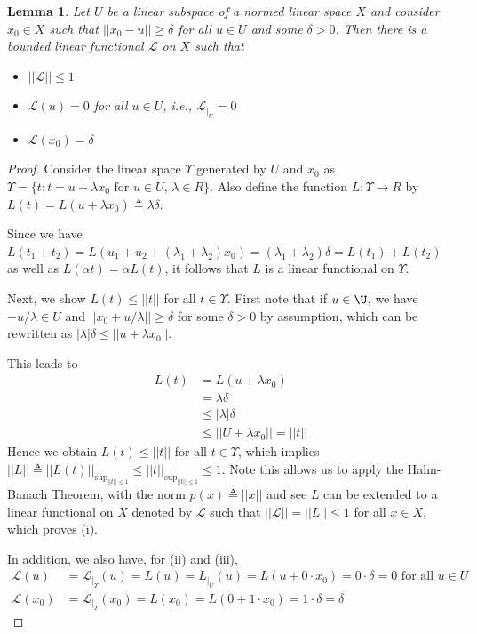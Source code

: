 \documentclass[12pt]{amsart}
\theoremstyle{plain}
\newtheorem{lemma}[thm]{Lemma}
\theoremstyle{definition}
\theoremstyle{remark}
\numberwithin{equation}{section}
\numberwithin{thm}{section}
\begin{document}
\begin{lemma} \label{lemma:ApplyHB}
    Let $U$ be a linear subspace of a normed linear space $X$ and consider $x_0 \in X$ such that $|| x_0 -u || \geq \delta$ for all $u \in U$ and some $\delta > 0$. Then there is a bounded linear functional $\mathcal{L}$ on $X$ such that
    \begin{itemize}
        \item[(i)] $||\mathcal{L}|| \leq 1$
        \item[(ii)] $\mathcal{L}(u)=0$ for all $u \in U$, i.e., $\mathcal{L}_{|_U}=0$
        \item[(iii)] $\mathcal{L}(x_0) = \delta$
    \end{itemize}    
\end{lemma}
\begin{proof}
    Consider the linear space $\Upsilon$ generated by $U$ and $x_0$ as $\Upsilon = \{ t : t =u+\lambda x_0 \text{ for } u \in U \text{, } \lambda \in R \}$. Also define the function $L: \Upsilon \to R$ by $L(t) = L(u+\lambda x_0) \triangleq \lambda \delta$.
    
    Since we have $L(t_1 + t_2) = L(u_1+u_2+(\lambda_1 + \lambda_2)x_0) = (\lambda_1 + \lambda_2)\delta = L(t_1) + L(t_2)$ as well as $L(\alpha t) = \alpha L(t)$, it follows that $L$ is a linear functional on $\Upsilon$.  

    Next, we show $L(t) \leq ||t||$ for all $t \in \Upsilon$. First note that if $u \in \U$, we have $-u/ \lambda \in U$ and $||x_0 + u/\lambda|| \geq \delta$ for some $\delta > 0$ by assumption, which can be rewritten as $|\lambda|\delta \leq ||u +\lambda x_0||$.
    
    This leads to 
    \begin{equation*}
        \begin{aligned}
            L(t) &= L(u+\lambda x_0)\\
            &= \lambda \delta \\
            &\leq |\lambda| \delta \\
            &\leq ||U+\lambda x_0 || =||t||
        \end{aligned}
    \end{equation*}
    Hence we obtain $L(t)\leq ||t||$ for all $t \in \Upsilon$, which implies $||L|| \triangleq ||L(t)||_{ \sup_{||t|| \leq 1}} \leq ||t||_{\sup_{||t||\leq 1}} \leq 1$. Note this allows us to apply the Hahn-Banach Theorem, with the norm $p(x)\triangleq ||x||$ and see $L$ can be extended to a linear functional on $X$ denoted by $\mathcal{L}$ such that $||\mathcal{L}||=||L||\leq 1$ for all $x \in X$, which proves (i).

    In addition, we also have, for (ii) and (iii), 
    \begin{equation*}
    \begin{aligned}
        \mathcal{L}(u) & = \mathcal{L}_|_\Upsilon (u) = L(u) = L_|_U (u) =  L(u+0\cdot x_0) = 0 \cdot \delta = 0 \text{ for all } u \in U \\
        \mathcal{L}(x_0) & = \mathcal{L}_|_\Upsilon (x_0)= L(x_0) = L(0+1\cdot x_0) = 1 \cdot \delta = \delta 
        \end{aligned}
    \end{equation*}
\end{proof}
\end{document}
